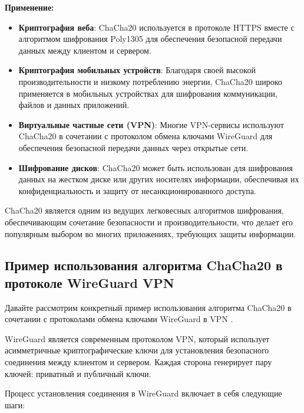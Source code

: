 \documentclass[12pt]{article}
\begin{document}
    \textbf{Применение:}

    \begin{itemize}
        \item \textbf{Криптография веба}: ChaCha20 используется в протоколе HTTPS вместе с алгоритмом шифрования Poly1305 для обеспечения безопасной передачи данных между клиентом и сервером.
        \item \textbf{Криптография мобильных устройств}: Благодаря своей высокой производительности и низкому потреблению энергии, ChaCha20 широко применяется в мобильных устройствах для шифрования коммуникации, файлов и данных приложений.
        \item \textbf{Виртуальные частные сети (VPN)}: Многие VPN-сервисы используют ChaCha20 в сочетании с протоколом обмена ключами WireGuard для обеспечения безопасной передачи данных через открытые сети.
        \item \textbf{Шифрование дисков}: ChaCha20 может быть использован для шифрования данных на жестком диске или других носителях информации, обеспечивая их конфиденциальность и защиту от несанкционированного доступа.
    \end{itemize}

    ChaCha20 является одним из ведущих легковесных алгоритмов шифрования, обеспечивающим сочетание безопасности и производительности, что делает его популярным выбором во многих приложениях, требующих защиты информации.

    \subsection{Пример использования алгоритма ChaCha20 в протоколе WireGuard VPN}
    Давайте рассмотрим конкретный пример использования алгоритма ChaCha20 в сочетании с протоколами обмена ключами WireGuard в VPN .

    WireGuard является современным протоколом VPN, который использует асимметричные криптографические ключи для установления безопасного соединения между клиентом и сервером.
    Каждая сторона генерирует пару ключей: приватный и публичный ключи.

    Процесс установления соединения в WireGuard включает в себя следующие шаги:
\end{document}
